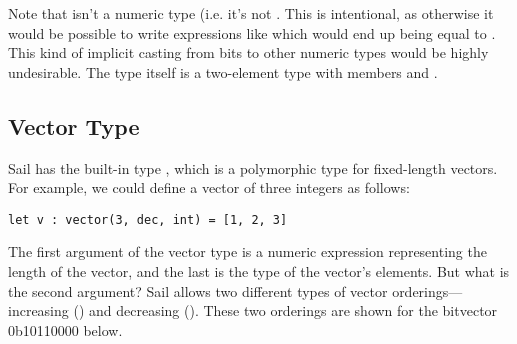 \begin{center}
\end{center}

Note that  isn't a numeric type (i.e. it's not
. This is intentional, as otherwise it would be
possible to write expressions like  which would end
up being equal to . This kind of implicit casting
from bits to other numeric types would be highly undesirable. The
 type itself is a two-element type with members  and
.

\subsection{Vector Type}
\label{sec:vec}

Sail has the built-in type , which is a polymorphic type for
fixed-length vectors. For example, we could define a vector  of
three integers as follows:
\begin{lstlisting}
let v : vector(3, dec, int) = [1, 2, 3]
\end{lstlisting}
The first argument of the vector type is a numeric expression
representing the length of the vector, and the last is the type of the
vector's elements. But what is the second argument? Sail allows two
different types of vector orderings---increasing () and
decreasing (). These two orderings are shown for the bitvector
0b10110000 below.

